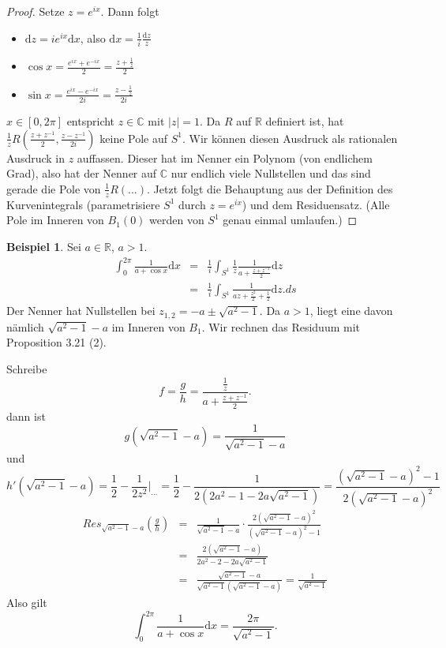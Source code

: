 \documentclass[11pt,titlepage]{article}
\theoremstyle{definition}
\newtheorem{example}[theorem]{Beispiel}
\theoremstyle{remark}
\begin{document}
	\begin{proof}
		Setze $z=e^{ix}$. Dann folgt
		\begin{itemize}
			\item $\mathrm{d}z=i e^{ix}\mathrm{d}x$, also $\mathrm{d}x=\frac{1}{i} \frac{\mathrm{d}z}{z}$
			\item $\cos x= \frac{e^{ix}+e^{-ix}}{2}=\frac{z+\frac{1}{z}}{2}$
			\item $\sin x= \frac{e^{ix}-e^{-ix}}{2i}=\frac{z-\frac{1}{z}}{2i} $
		\end{itemize}
		$x\in[0,2\pi]$ entspricht $z\in\mathbb{C}$ mit $|z|=1$. Da $R$ auf $\mathbb{R}$ definiert ist, hat 
		$\frac{1}{z} R\left(\frac{z+z^{-1}}{2},\frac{z-z^{-1}}{2i}\right)$ keine Pole auf $S^1$. Wir können 
		diesen Ausdruck als rationalen Ausdruck in $z$ auffassen. Dieser hat im Nenner ein Polynom (von 	
		endlichem Grad), also hat der Nenner auf $\mathbb{C}$ nur endlich viele Nullstellen und das sind 
		gerade die Pole von $\frac{1}{z}R(\ldots)$. Jetzt folgt die Behauptung aus der Definition des 
		Kurvenintegrals (parametrisiere $S^1$ durch $z=e^{ix}$) und dem Residuensatz. 
		(Alle Pole im Inneren von $B_1(0)$ werden von $S^1$ genau einmal umlaufen.)
	\end{proof}
	
	\begin{example}
		Sei $a\in \mathbb{R}$, $a>1$.
		\begin{eqnarray*}
			 \int_0^{2\pi} \frac{1}{a+\cos x}\mathrm{d}x &=& \frac{1}{i}\int_{S^1}\frac{1}{z} 
			 \frac{1}{a+\frac{z+z^{-1}}{2}}\mathrm{d}z \\
			 &=& \frac{1}{i}\int_{S^1} \frac{1}{az+\frac{z^2}{2}+\frac{1}{2}}\mathrm{d}z.ds
		\end{eqnarray*}
		Der Nenner hat Nullstellen bei $z_{1,2}=-a\pm \sqrt{a^2 -1}$. Da $a>1$, liegt eine davon nämlich 
		$\sqrt{a^2 -1}-a$ im Inneren von $B_1$. Wir rechnen das Residuum mit Proposition 3.21 (2). 
		
		
		Schreibe
		\[ f=\frac{g}{h} =\frac{\frac{1}{z}}{a+\frac{z+z^{-1}}{2}}. \]
		dann ist 
		\[ g(\sqrt{a^2 -1}-a)=\frac{1}{\sqrt{a^2 -1}-a} \]
		und
		\[ h'(\sqrt{a^2 -1}-a) =\frac{1}{2}-\frac{1}{2z^2}|_{\ldots}=\frac{1}{2}-\frac{1}{2(2a^2 -1-2a\sqrt{a^2 -1})}
		=\frac{(\sqrt{a^2 -1}-a)^2 -1}{2(\sqrt{a^2 -1}-a)^2} \]
		\begin{eqnarray*}
			Res_{\sqrt{a^2 -1}-a}(\frac{g}{h}) 
			&=& \frac{1}{\sqrt{a^2 -1}-a}\cdot \frac{2(\sqrt{a^2 -1}-a)^2}{(\sqrt{a^2 -1}-a)^2 -1} \\
			&=& \frac{2(\sqrt{a^2 -1}-a)}{2a^2 -2 -2a\sqrt{a^2 -1}} \\
			&=& \frac{\sqrt{a^2 -1}-a}{\sqrt{a^2 -1}(\sqrt{a^2 -1}-a)} =\frac{1}{\sqrt{a^2 -1}}
		\end{eqnarray*}
		Also gilt
		\[ \int_0^{2\pi} \frac{1}{a+\cos x}\mathrm{d}x = \frac{2\pi}{\sqrt{a^2 -1}}. \]
	\end{example}
	
\end{document}

